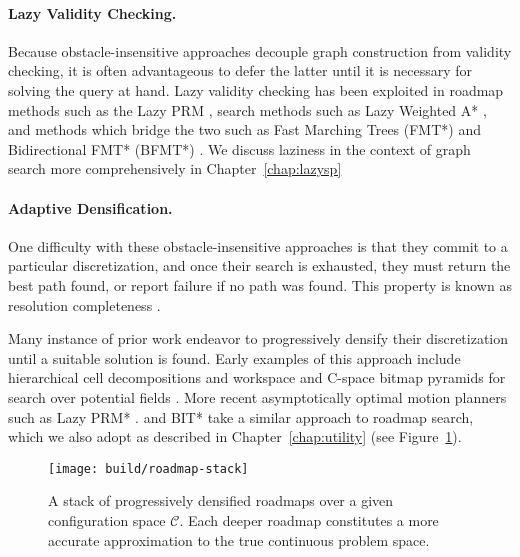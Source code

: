 \paragraph{Lazy Validity Checking.}
Because obstacle-insensitive approaches decouple graph construction
from validity checking,
it is often advantageous to defer the latter until it is
necessary for solving the query at hand.
Lazy validity checking has been exploited
in roadmap methods such as the Lazy PRM
\citep{bohlin2000lazyprm, hauser2015lazy},
search methods such as Lazy Weighted A* \citep{cohen2014narms},
and methods which bridge the two
such as Fast Marching Trees (FMT*) \citep{janson2015fmtstar}
and Bidirectional FMT* (BFMT*) \citep{starek2015bfmtstar}.
We discuss laziness in the context of graph search
more comprehensively in Chapter~\ref{chap:lazysp}

\paragraph{Adaptive Densification.}
One difficulty with these obstacle-insensitive approaches
is that they commit to a particular discretization,
and once their search is exhausted,
they must return the best path found,
or report failure if no path was found.
This property is known as resolution completeness
\citep{cheng2004rescomplete}.

Many instance of prior work endeavor to progressively
densify their discretization until a suitable solution is found.
Early examples of this approach include
hierarchical cell decompositions \citep{faverjon1984octree}
and workspace and C-space bitmap pyramids for search over potential fields
\citep{barraquand1991distributedrepresentation}.
More recent asymptotically optimal motion planners such as
Lazy PRM* \citep{hauser2015lazy}.
and BIT* \citep{gammell2015bitstar} take a similar approach to
roadmap search,
which we also adopt as described in Chapter~\ref{chap:utility}
(see Figure~\ref{fig:roadmaps:roadmap-stack}).

\begin{figure}
   \centering
   \texttt{[image: build/roadmap-stack]}
   \caption{A stack of progressively densified roadmaps
      over a given configuration space $\mathcal{C}$.
      Each deeper roadmap constitutes a more accurate approximation
      to the true continuous problem space.}
   \label{fig:roadmaps:roadmap-stack}
\end{figure}


